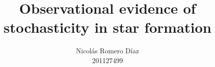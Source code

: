\title{Observational evidence of stochasticity in star formation}
\author{Nicol\'as Romero D\'iaz \\ 201127499}
